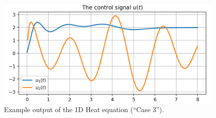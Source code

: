 \documentclass[11pt, a4paper]{amsart}
\theoremstyle{definition}
\numberwithin{equation}{section}
\begin{document}
\begin{figure}[h!]
\begin{minipage}{0.48\linewidth}
    \vspace{2ex}

    \begin{center}
      \includegraphics[width=0.93\linewidth]{H1d3control.png}
    \end{center}
  \end{minipage}
\caption{Example output of the 1D Heat equation (``Case 3'').}
  \label{fig:1Dheat3}
\end{figure}
\end{document}

